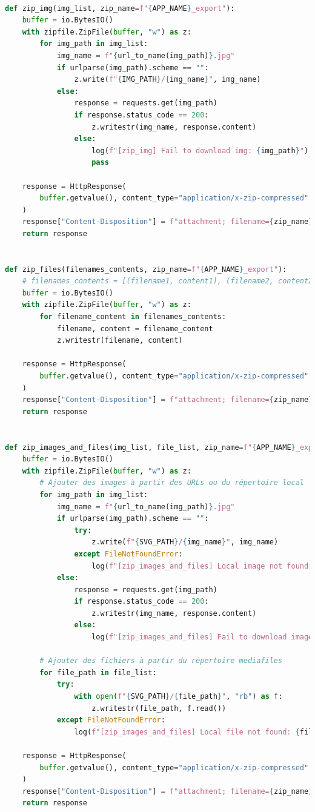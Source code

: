 \begin{lstlisting}[language=python, frame=single, breaklines=true, caption={Fonctions utilitaires pour compresser et télécharger les images.}]

def zip_img(img_list, zip_name=f"{APP_NAME}_export"):
    buffer = io.BytesIO()
    with zipfile.ZipFile(buffer, "w") as z:
        for img_path in img_list:
            img_name = f"{url_to_name(img_path)}.jpg"
            if urlparse(img_path).scheme == "":
                z.write(f"{IMG_PATH}/{img_name}", img_name)
            else:
                response = requests.get(img_path)
                if response.status_code == 200:
                    z.writestr(img_name, response.content)
                else:
                    log(f"[zip_img] Fail to download img: {img_path}")
                    pass

    response = HttpResponse(
        buffer.getvalue(), content_type="application/x-zip-compressed"
    )
    response["Content-Disposition"] = f"attachment; filename={zip_name}.zip"
    return response


def zip_files(filenames_contents, zip_name=f"{APP_NAME}_export"):
    # filenames_contents = [(filename1, content1), (filename2, content2), ...]
    buffer = io.BytesIO()
    with zipfile.ZipFile(buffer, "w") as z:
        for filename_content in filenames_contents:
            filename, content = filename_content
            z.writestr(filename, content)

    response = HttpResponse(
        buffer.getvalue(), content_type="application/x-zip-compressed"
    )
    response["Content-Disposition"] = f"attachment; filename={zip_name}.zip"
    return response


def zip_images_and_files(img_list, file_list, zip_name=f"{APP_NAME}_export"):
    buffer = io.BytesIO()
    with zipfile.ZipFile(buffer, "w") as z:
        # Ajouter des images à partir des URLs ou du répertoire local
        for img_path in img_list:
            img_name = f"{url_to_name(img_path)}.jpg"
            if urlparse(img_path).scheme == "":
                try:
                    z.write(f"{SVG_PATH}/{img_name}", img_name)
                except FileNotFoundError:
                    log(f"[zip_images_and_files] Local image not found: {img_path}")
            else:
                response = requests.get(img_path)
                if response.status_code == 200:
                    z.writestr(img_name, response.content)
                else:
                    log(f"[zip_images_and_files] Fail to download image: {img_path}")

        # Ajouter des fichiers à partir du répertoire mediafiles
        for file_path in file_list:
            try:
                with open(f"{SVG_PATH}/{file_path}", "rb") as f:
                    z.writestr(file_path, f.read())
            except FileNotFoundError:
                log(f"[zip_images_and_files] Local file not found: {file_path}")

    response = HttpResponse(
        buffer.getvalue(), content_type="application/x-zip-compressed"
    )
    response["Content-Disposition"] = f"attachment; filename={zip_name}.zip"
    return response

\end{lstlisting}

